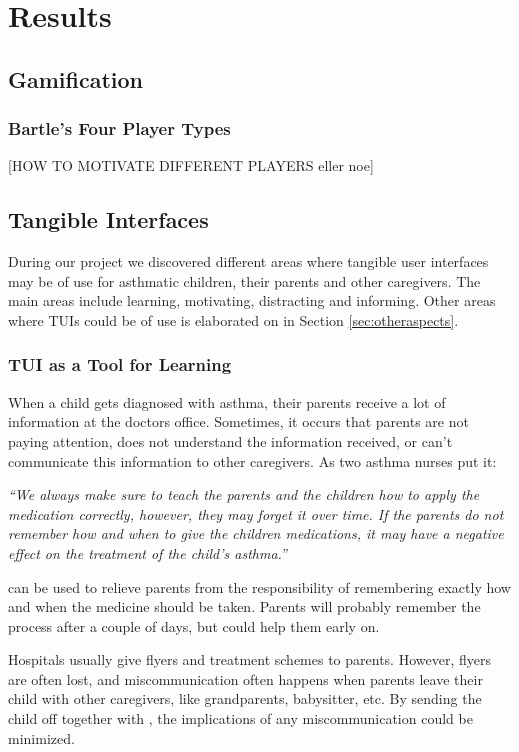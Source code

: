 \chapter{Results}
\label{chp:results}

\section{Gamification}
\label{sec:gamificationresults}



\subsection{Bartle's Four Player Types}
[HOW TO MOTIVATE DIFFERENT PLAYERS eller noe]

\section{Tangible Interfaces}
\label{sec:resultstui}
During our project we discovered different areas where tangible user interfaces may be of use for asthmatic children, their parents and other caregivers. The main areas include learning, motivating, distracting and informing. Other areas where TUIs could be of use is elaborated on in Section \ref{sec:otheraspects}.


\subsection{TUI as a Tool for Learning}

When a child gets diagnosed with asthma, their parents receive a lot of information at the doctors office. Sometimes, it occurs that parents are not paying attention, does not understand the information received, or can't communicate this information to other caregivers. As two asthma nurses put it: 

\textit{``We always make sure to teach the parents and the children how to apply the medication correctly, however, they may forget it over time. If the parents do not remember how and when to give the children medications, it may have a negative effect on the treatment of the child's asthma.''}

\buddy{} can be used to relieve parents from the responsibility of remembering exactly how and when the medicine should be taken. Parents will probably remember the process after a couple of days, but \buddy{} could help them early on. 

Hospitals usually give flyers and treatment schemes to parents. However, flyers are often lost, and miscommunication often happens when parents leave their child with other caregivers, like grandparents, babysitter, etc. By sending the child off together with \buddy{}, the implications of any miscommunication could be minimized.    


